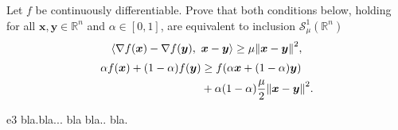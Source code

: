 \documentclass{article}
\newcommand{\R}{\mathbb{R}}
\newcommand{\xB}{\bm{x}}
\renewcommand{\grad}{\nabla}
\newcommand{\yB}{\bm{y}}
\newcommand{\SM}{\mathcal{S}}
\newcommand{\strongconvextype}[2]{\SM_{#1}^{#2}(\R^n)}
\begin{document}
\begin{excercise}\label{e3}
Let $f$ be continuously differentiable. Prove that both conditions below, holding for all $\xB, \yB \in \R^n$  and $\alpha \in [0,1]$, are equivalent to inclusion $\strongconvextype{\mu}{1}$
\begin{equation}
	\innerprod{\grad f(\xB) - \grad f(\yB)}{\xB - \yB} \geq \mu \norm{\xB - \yB}^2,
\end{equation}
\begin{align}
	\alpha f(\xB) + (1-\alpha) f(\yB) &\geq f(\alpha \xB + (1-\alpha) \yB )\nonumber\\
	&+ \alpha (1-\alpha) \frac{\mu}{2} \norm{\xB - \yB}^2.
\end{align}
\end{excercise}

\begin{PROOF}{e3}
bla.bla... bla bla.. bla.
\end{PROOF}
\end{document}
